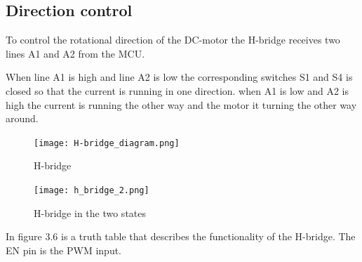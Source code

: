 \begin{figure}[!h]
	\centering
\end{figure}

\subsection{Direction control} 
To control the rotational direction of the DC-motor the H-bridge receives two lines A1 and A2 from the MCU.

When line A1 is high and line A2 is low the corresponding switches S1 and S4 is closed so that the current is running in one direction. when A1 is low and A2 is high the current is running the other way and the motor it turning the other way around. \\
  \begin{figure}[!h!]
	\centering
	\texttt{[image: H-bridge\_diagram.png]}
	\caption{H-bridge}
	\label{fig:3}
\end{figure}


  \begin{figure}[!h!]
	\centering
	\texttt{[image: h\_bridge\_2.png]}
	\caption{H-bridge in the two states}
	\label{fig:3}
\end{figure}

In figure 3.6 is a truth table that describes the functionality of the H-bridge. The EN pin is the PWM input.  

